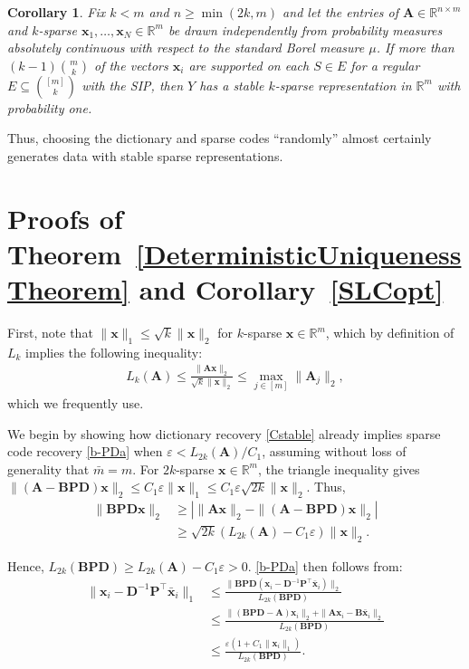 \documentclass[9pt,twocolumn]{pnas-new}
\newtheorem{corollary}{Corollary}
\begin{document}
\begin{corollary}\label{ProbabilisticCor}
Fix $k < m$ and $n \geq \min(2k, m)$ 
and let the entries of $\mathbf{A} \in \mathbb{R}^{n \times m}$ and $k$-sparse $\mathbf{x}_1, \ldots, \mathbf{x}_N \in \mathbb{R}^m$ be drawn independently from probability measures absolutely continuous with respect to the standard Borel measure $\mu$. If more than $(k-1){m \choose k}$ of the vectors $\mathbf{x}_i$ are supported on each $S \in E$ for a regular $E \subseteq {[m] \choose k}$ with the SIP, then $Y$ has a stable $k$-sparse representation in $\mathbb{R}^m$ with probability one.
\end{corollary}

Thus, choosing the dictionary and sparse codes ``randomly'' almost certainly generates data with stable sparse representations.

\section{Proofs of Theorem~\ref{DeterministicUniquenessTheorem} and Corollary~\ref{SLCopt}}\label{DUT}

First, note that $\|\mathbf{x}\|_1 \leq \sqrt{k} \|\mathbf{x}\|_2$ for $k$-sparse $\mathbf{x} \in \mathbb{R}^m$, which by definition of $L_k$ implies the following inequality:
\begin{align}\label{delrho}
L_k(\mathbf{A}) \leq \frac{\|\mathbf{A}\mathbf{x}\|_2}{\sqrt{k} \|\mathbf{x}\|_2} 
\leq  \max_{j \in [m]}\|\mathbf{A}_j\|_2,
\end{align}
which we frequently use.

We begin by showing how dictionary recovery \eqref{Cstable} already implies sparse code recovery \eqref{b-PDa} when \mbox{$\varepsilon < L_{2k}(\mathbf{A}) / C_1$}, assuming without loss of generality that $\bar m = m$. For $2k$-sparse $\mathbf{x} \in \mathbb{R}^m$, the triangle inequality gives \mbox{$\|(\mathbf{A}-\mathbf{BPD})\mathbf{x}\|_2  \leq C_1\varepsilon \|\mathbf{x}\|_1 \leq C_1 \varepsilon \sqrt{2k}  \|\mathbf{x}\|_2$}. Thus, 
\begin{align*}
\|\mathbf{BPD}\mathbf{x}\|_2 
&\geq | \|\mathbf{A}\mathbf{x}\|_2 - \|(\mathbf{A}-\mathbf{BPD})\mathbf{x}\|_2 | \\
&\geq \sqrt{2k} (L_{2k}(\mathbf{A}) -  C_1\varepsilon) \|\mathbf{x}\|_2.
\end{align*}

Hence, $L_{2k}(\mathbf{BPD}) \geq L_{2k}(\mathbf{A}) - C_1\varepsilon  > 0$. \eqref{b-PDa} then follows from:
\begin{align*}
\|\mathbf{x}_i - \mathbf{D}^{-1}\mathbf{P}^{\top}\mathbf{\bar x}_i \|_1
&\leq \frac{\|\mathbf{BPD}(\mathbf{x}_i - \mathbf{D}^{-1}\mathbf{P}^{\top}\mathbf{\bar x}_i)\|_2}{L_{2k}(\mathbf{BPD})} \\
&\leq \frac{\|(\mathbf{BPD} - \mathbf{A})\mathbf{x}_i\|_2 + \|\mathbf{A}\mathbf{x}_i - \mathbf{B}\mathbf{\bar x}_i\|_2}{L_{2k}(\mathbf{BPD})} \\
&\leq \frac{\varepsilon (1 + C_1 \|\mathbf{x}_i\|_1)}{L_{2k}(\mathbf{BPD})}.
\end{align*}
\end{document}

